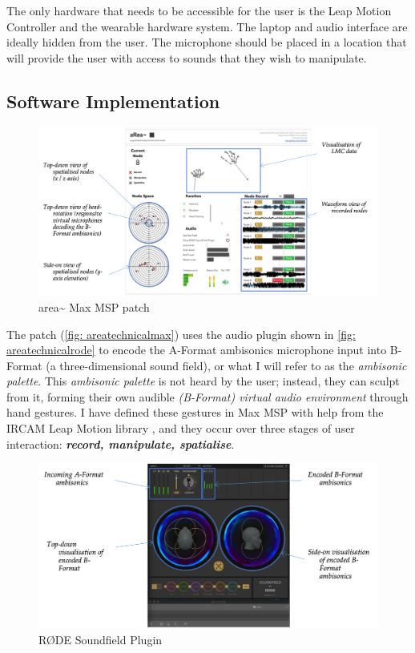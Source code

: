 The only hardware that needs to be accessible for the user is the Leap Motion Controller and the wearable hardware system. The laptop and audio interface are ideally hidden from the user. The microphone should be placed in a location that will provide the user with access to sounds that they wish to manipulate.

\subsection{Software Implementation}            \label{sec: area-system-software}

\begin{figure}
    \centering
    \includegraphics[width=\linewidth]{figures/05-area/areatechnical_max.png}
    \caption{area\textasciitilde{} Max MSP patch}
    \label{fig: areatechnicalmax}
\end{figure}
The patch (\autoref{fig: areatechnicalmax}) uses the audio plugin \citep{rode2020} shown in \autoref{fig: areatechnicalrode} to encode the A-Format ambisonics microphone input into B-Format (a three-dimensional sound field), or what I will refer to as the \textit{ambisonic palette}. This \textit{ambisonic palette} is not heard by the user; instead, they can sculpt from it, forming their own audible \textit{(B-Format) virtual audio environment} through hand gestures. I have defined these gestures in Max MSP with help from the IRCAM Leap Motion library \citeyearpar{ircam2014}, and they occur over three stages of user interaction: \textit{\textbf{record, manipulate, spatialise}}. 

\begin{figure}
    \centering
    \includegraphics[width=\linewidth]{figures/05-area/areatechnical_rode.png}
    \caption{RØDE Soundfield Plugin}
    \label{fig: areatechnicalrode}
\end{figure}

